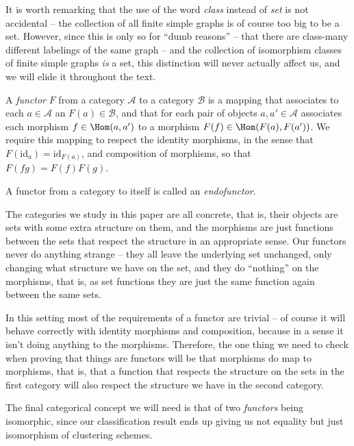 \documentclass[a4paper,reqno,oneside]{article} %
\begin{document}
It is worth remarking that the use of the word \emph{class} instead of \emph{set} is not accidental -- the collection of all finite simple graphs is of course too big to be a set. However, since this is only so for ``dumb reasons'' -- that there are class-many different labelings of the same graph -- and the collection of isomorphism classes of finite simple graphs \emph{is} a set, this distinction will never actually affect us, and we will elide it throughout the text.

\begin{definition}
    A \emph{functor} $F$ from a category $\mathcal{A}$ to a category $\mathcal{B}$ is a mapping that associates to each $a \in \mathcal{A}$ an $F(a) \in \mathcal{B}$, and that for each pair of objects $a, a' \in \mathcal{A}$ associates each morphism $f \in \Hom(a, a')$ to a morphism $F(f) \in \Hom(F(a), F(a'))$. We require this mapping to respect the identity morphisms, in the sense that $F(\mathrm{id}_a) = \mathrm{id}_{F(a)}$, and composition of morphisms, so that $F(fg) = F(f)F(g)$.

    A functor from a category to itself is called an \emph{endofunctor}.
\end{definition}

The categories we study in this paper are all concrete, that is, their objects are sets with some extra structure on them, and the morphisms are just functions between the sets that respect the structure in an appropriate sense. Our functors never do anything strange -- they all leave the underlying set unchanged, only changing what structure we have on the set, and they do ``nothing'' on the morphisms, that is, as set functions they are just the same function again between the same sets.

In this setting most of the requirements of a functor are trivial -- of course it will behave correctly with identity morphisms and composition, because in a sense it isn't doing anything to the morphisms. Therefore, the one thing we need to check when proving that things are functors will be that morphisms do map to morphisms, that is, that a function that respects the structure on the sets in the first category will also respect the structure we have in the second category.

The final categorical concept we will need is that of two \emph{functors} being isomorphic, since our classification result ends up giving us not equality but just isomorphism of clustering schemes.
\end{document}
